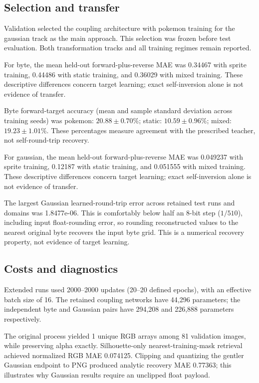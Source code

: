 \subsection{Selection and transfer}

Validation selected the coupling architecture with pokemon training for the gaussian track as the main approach. This selection was frozen before test evaluation. Both transformation tracks and all training regimes remain reported.

For byte, the mean held-out forward-plus-reverse MAE was 0.34467 with sprite training, 0.44486 with static training, and 0.36029 with mixed training. These descriptive differences concern target learning; exact self-inversion alone is not evidence of transfer.

Byte forward-target accuracy (mean and sample standard deviation across training seeds) was pokemon: $20.88\pm0.70$\%; static: $10.59\pm0.96$\%; mixed: $19.23\pm1.01$\%. These percentages measure agreement with the prescribed teacher, not self-round-trip recovery.

For gaussian, the mean held-out forward-plus-reverse MAE was 0.049237 with sprite training, 0.12187 with static training, and 0.051555 with mixed training. These descriptive differences concern target learning; exact self-inversion alone is not evidence of transfer.

The largest Gaussian learned-round-trip error across retained test runs and domains was 1.8477e-06. This is comfortably below half an 8-bit step ($1/510$), including input float-rounding error, so rounding reconstructed values to the nearest original byte recovers the input byte grid. This is a numerical recovery property, not evidence of target learning.

\subsection{Costs and diagnostics}

Extended runs used 2000--2000 updates (20--20 defined epochs), with an effective batch size of 16. The retained coupling networks have 44,296 parameters; the independent byte and Gaussian pairs have 294,208 and 226,888 parameters respectively.

The original process yielded 1 unique RGB arrays among 81 validation images, while preserving alpha exactly. Silhouette-only nearest-training-mask retrieval achieved normalized RGB MAE 0.074125. Clipping and quantizing the gentler Gaussian endpoint to PNG produced analytic recovery MAE 0.77363; this illustrates why Gaussian results require an unclipped float payload.

